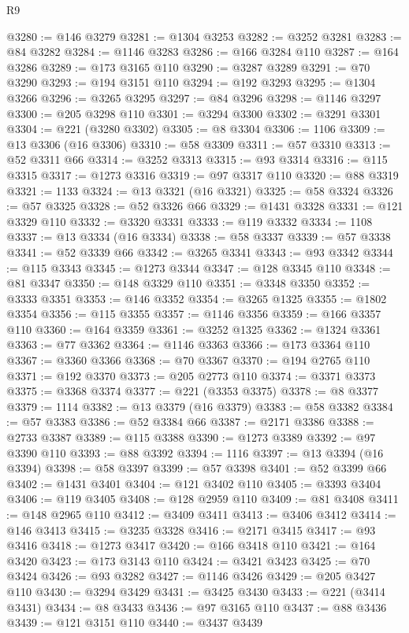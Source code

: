 \begin{lexlean}{R9}
\begin{coremodule}
@3280 := @146 @3279
@3281 := @1304 @3253
@3282 := @3252 @3281
@3283 := @84 @3282
@3284 := @1146 @3283
@3286 := @166 @3284 @110
@3287 := @164 @3286
@3289 := @173 @3165 @110
@3290 := @3287 @3289
@3291 := @70 @3290
@3293 := @194 @3151 @110
@3294 := @192 @3293
@3295 := @1304 @3266
@3296 := @3265 @3295
@3297 := @84 @3296
@3298 := @1146 @3297
@3300 := @205 @3298 @110
@3301 := @3294 @3300
@3302 := @3291 @3301
@3304 := @221 (@3280 @3302)
@3305 := @8 @3304
@3306 := 1106
@3309 := @13 @3306 (@16 @3306)
@3310 := @58 @3309
@3311 := @57 @3310
@3313 := @52 @3311 @66
@3314 := @3252 @3313
@3315 := @93 @3314
@3316 := @115 @3315
@3317 := @1273 @3316
@3319 := @97 @3317 @110
@3320 := @88 @3319
@3321 := 1133
@3324 := @13 @3321 (@16 @3321)
@3325 := @58 @3324
@3326 := @57 @3325
@3328 := @52 @3326 @66
@3329 := @1431 @3328
@3331 := @121 @3329 @110
@3332 := @3320 @3331
@3333 := @119 @3332
@3334 := 1108
@3337 := @13 @3334 (@16 @3334)
@3338 := @58 @3337
@3339 := @57 @3338
@3341 := @52 @3339 @66
@3342 := @3265 @3341
@3343 := @93 @3342
@3344 := @115 @3343
@3345 := @1273 @3344
@3347 := @128 @3345 @110
@3348 := @81 @3347
@3350 := @148 @3329 @110
@3351 := @3348 @3350
@3352 := @3333 @3351
@3353 := @146 @3352
@3354 := @3265 @1325
@3355 := @1802 @3354
@3356 := @115 @3355
@3357 := @1146 @3356
@3359 := @166 @3357 @110
@3360 := @164 @3359
@3361 := @3252 @1325
@3362 := @1324 @3361
@3363 := @77 @3362
@3364 := @1146 @3363
@3366 := @173 @3364 @110
@3367 := @3360 @3366
@3368 := @70 @3367
@3370 := @194 @2765 @110
@3371 := @192 @3370
@3373 := @205 @2773 @110
@3374 := @3371 @3373
@3375 := @3368 @3374
@3377 := @221 (@3353 @3375)
@3378 := @8 @3377
@3379 := 1114
@3382 := @13 @3379 (@16 @3379)
@3383 := @58 @3382
@3384 := @57 @3383
@3386 := @52 @3384 @66
@3387 := @2171 @3386
@3388 := @2733 @3387
@3389 := @115 @3388
@3390 := @1273 @3389
@3392 := @97 @3390 @110
@3393 := @88 @3392
@3394 := 1116
@3397 := @13 @3394 (@16 @3394)
@3398 := @58 @3397
@3399 := @57 @3398
@3401 := @52 @3399 @66
@3402 := @1431 @3401
@3404 := @121 @3402 @110
@3405 := @3393 @3404
@3406 := @119 @3405
@3408 := @128 @2959 @110
@3409 := @81 @3408
@3411 := @148 @2965 @110
@3412 := @3409 @3411
@3413 := @3406 @3412
@3414 := @146 @3413
@3415 := @3235 @3328
@3416 := @2171 @3415
@3417 := @93 @3416
@3418 := @1273 @3417
@3420 := @166 @3418 @110
@3421 := @164 @3420
@3423 := @173 @3143 @110
@3424 := @3421 @3423
@3425 := @70 @3424
@3426 := @93 @3282
@3427 := @1146 @3426
@3429 := @205 @3427 @110
@3430 := @3294 @3429
@3431 := @3425 @3430
@3433 := @221 (@3414 @3431)
@3434 := @8 @3433
@3436 := @97 @3165 @110
@3437 := @88 @3436
@3439 := @121 @3151 @110
@3440 := @3437 @3439

\end{coremodule}
\end{lexlean}
